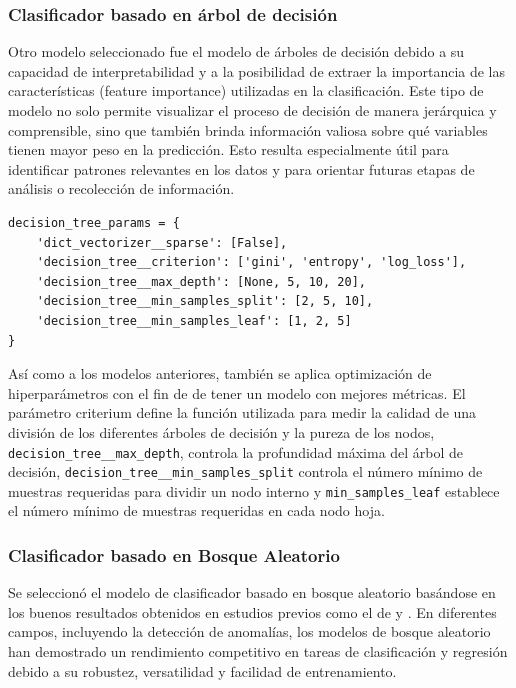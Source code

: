 \documentclass[11pt,a4paper,spanish]{book}
\numberwithin{equation}{chapter}
\numberwithin{figure}{chapter}
\begin{document}
\subsubsection{Clasificador basado en árbol de decisión}

Otro modelo seleccionado fue el modelo de árboles de decisión debido a su capacidad de 
interpretabilidad y a la posibilidad de extraer la importancia de las características 
(feature importance) utilizadas en la clasificación. Este tipo de modelo no solo permite 
visualizar el proceso de decisión de manera jerárquica y comprensible, sino que también 
brinda información valiosa sobre qué variables tienen mayor peso en la predicción. 
Esto resulta especialmente útil para identificar patrones relevantes en los datos y 
para orientar futuras etapas de análisis o recolección de información.


\vspace{5mm}
\begin{lstlisting}
decision_tree_params = {
    'dict_vectorizer__sparse': [False],
    'decision_tree__criterion': ['gini', 'entropy', 'log_loss'],
    'decision_tree__max_depth': [None, 5, 10, 20],
    'decision_tree__min_samples_split': [2, 5, 10],
    'decision_tree__min_samples_leaf': [1, 2, 5]
}
\end{lstlisting}

Así como a los modelos anteriores, también se aplica optimización de hiperparámetros 
con el fin de  de tener un modelo con mejores métricas. El parámetro criterium define 
la función utilizada para medir la calidad de una división de los diferentes árboles de 
decisión y la pureza de los nodos, \lstinline|decision_tree__max_depth|, controla la 
profundidad máxima del árbol de decisión, \lstinline|decision_tree__min_samples_split|  
controla el número mínimo de muestras requeridas para dividir un nodo interno y 
\lstinline|min_samples_leaf| establece el número mínimo de muestras requeridas en 
cada nodo hoja. 


\subsubsection{Clasificador basado en Bosque Aleatorio}

Se seleccionó el modelo de clasificador basado en bosque aleatorio basándose en los 
buenos resultados obtenidos en estudios previos como el de \cite{canovas2017random} 
y \cite{yu2025tkeo}. En diferentes campos, incluyendo la detección de anomalías, 
los modelos de bosque aleatorio han demostrado un rendimiento competitivo en tareas 
de clasificación y regresión debido a su robustez, versatilidad y facilidad de 
entrenamiento. 
\end{document}
